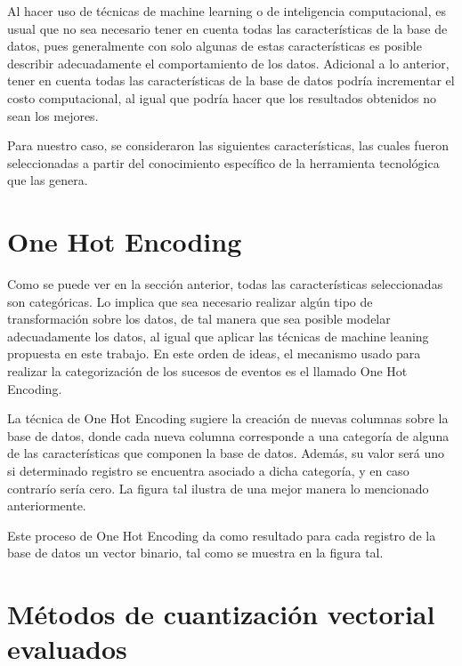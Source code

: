 Al hacer uso de técnicas de machine learning o de inteligencia computacional, es usual que no sea necesario tener en cuenta todas las características de la base de datos, pues generalmente con solo algunas de estas características es posible describir adecuadamente el comportamiento de los datos. Adicional a lo anterior, tener en cuenta todas las características de la base de datos podría incrementar el costo computacional, al igual que podría hacer que los resultados obtenidos no sean los mejores. 

Para nuestro caso, se consideraron las siguientes características, las cuales fueron seleccionadas a partir del conocimiento específico de la herramienta tecnológica que las genera.


\section{One Hot Encoding} %
\label{section2.2}

Como se puede ver en la sección anterior, todas las características seleccionadas son categóricas. Lo implica que sea necesario realizar algún tipo de transformación sobre los datos, de tal manera que sea posible modelar adecuadamente los datos, al igual que aplicar las técnicas de machine leaning propuesta en este trabajo. En este orden de ideas, el mecanismo usado para realizar la categorización de los sucesos de eventos es el llamado One Hot Encoding. 

La técnica de One Hot Encoding sugiere la creación de nuevas columnas sobre la base de datos, donde cada nueva columna corresponde a una categoría de alguna de las características que componen la base de datos. Además, su valor será uno si determinado registro se encuentra asociado a dicha categoría, y en caso contrarío sería cero. La figura tal ilustra de una mejor manera lo mencionado anteriormente.  

Este proceso de One Hot Encoding da como resultado para cada registro de la base de datos un vector binario, tal como se muestra en la figura tal.

\section{Métodos de cuantización vectorial evaluados} %
\label{section2.3}

